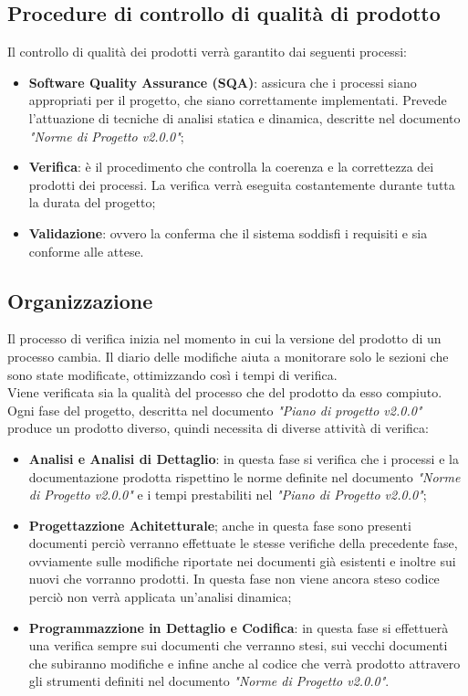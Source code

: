 \documentclass[12pt,a4paper,titlepage]{article}
\begin{document}
	\subsection{Procedure di controllo di qualità di prodotto}
	Il controllo di qualità dei prodotti verrà garantito dai seguenti processi:
	\begin{itemize}
		\item \textbf{Software Quality Assurance (SQA)}: assicura che i processi siano appropriati per il progetto, che siano correttamente implementati. Prevede l'attuazione di tecniche di analisi statica e dinamica, descritte nel documento \textit{"Norme di Progetto v2.0.0"};
		\item \textbf{Verifica}: è il procedimento che controlla la coerenza e la correttezza dei prodotti dei processi. La verifica verrà eseguita costantemente durante tutta la durata del progetto;
		\item \textbf{Validazione}: ovvero la conferma che il sistema soddisfi i requisiti e sia conforme alle attese.
	\end{itemize}

	\subsection{Organizzazione}
	Il processo di verifica inizia nel momento in cui la versione del prodotto di un processo cambia. Il diario delle modifiche aiuta a monitorare solo le sezioni che sono state modificate, ottimizzando così i tempi di verifica.\\
	Viene verificata sia la qualità del processo che del prodotto da esso compiuto.\\
	Ogni fase del progetto, descritta nel documento \textit{"Piano di progetto v2.0.0"} produce un prodotto diverso, quindi necessita di diverse attività di verifica:
	\begin{itemize}
		\item \textbf{Analisi e Analisi di Dettaglio}: in questa fase si verifica che i processi e la documentazione prodotta rispettino le norme definite nel documento \textit{"Norme di Progetto v2.0.0"} e i tempi prestabiliti nel \textit{"Piano di Progetto v2.0.0"};
	    \item \textbf{Progettazzione Achitetturale}; anche in questa fase sono presenti documenti perciò verranno effettuate le stesse verifiche della precedente fase, ovviamente sulle modifiche riportate nei documenti già esistenti e inoltre sui nuovi che vorranno prodotti. In questa fase non viene ancora steso codice perciò non verrà applicata un'analisi dinamica;
	    \item \textbf{Programmazzione in Dettaglio e Codifica}: in questa fase si effettuerà una verifica sempre sui documenti che verranno stesi, sui vecchi documenti che subiranno modifiche e infine anche al codice che verrà prodotto attravero gli strumenti definiti nel documento \textit{"Norme di Progetto v2.0.0"}.
	\end{itemize}
\end{document}
